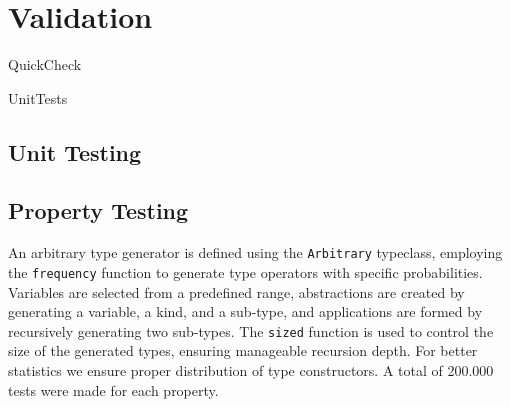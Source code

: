 \chapter{Validation}



\begin{description}[wide=0pt, leftmargin=1.5em, itemsep=0.2em]
  \item[test]
    \begin{description}[wide=0pt, leftmargin=1.5em, itemsep=0.2em]
      \item[\textgreater] QuickCheck
      \item[\textgreater] UnitTests
      \item[\textcolor{purple}{Spec.hs}]
      \item[\textcolor{purple}{UnitSpec.hs}]
    \end{description}
\end{description}


\section{Unit Testing}

\section{Property Testing}

An arbitrary type generator is defined using the \lstinline{Arbitrary} typeclass, employing the \lstinline{frequency} function to generate type operators with specific probabilities. Variables are selected from a predefined range, abstractions are created by generating a variable, a kind, and a sub-type, and applications are formed by recursively generating two sub-types. The \lstinline{sized} function is used to control the size of the generated types, ensuring manageable recursion depth. For better statistics we ensure proper distribution of type constructors. A total of 200.000 tests were made for each property.

